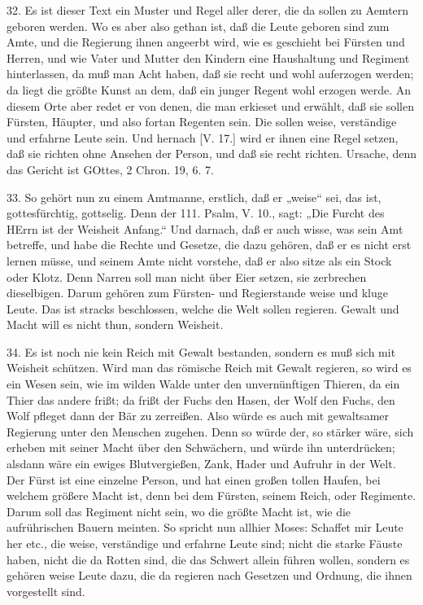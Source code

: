 32. Es ist dieser Text ein Muster und Regel aller derer, die da sollen zu Aemtern geboren werden. Wo es aber also gethan ist, daß die Leute geboren sind zum Amte, und die Regierung ihnen angeerbt wird, wie es geschieht bei Fürsten und Herren, und wie Vater und Mutter den Kindern eine Haushaltung und Regiment hinterlassen, da muß man Acht haben, daß sie recht und wohl auferzogen werden; da liegt die größte Kunst an dem, daß ein junger Regent wohl erzogen werde. An diesem Orte aber redet er von denen, die man erkieset und erwählt, daß sie sollen Fürsten, Häupter, und also fortan Regenten sein. Die sollen weise, verständige und erfahrne Leute sein. Und hernach [V. 17.] wird er ihnen eine Regel setzen, daß sie richten ohne Ansehen der Person, und daß sie recht richten. Ursache, denn das Gericht ist GOttes, 2 Chron. 19, 6. 7.

33. So gehört nun zu einem Amtmanne, erstlich, daß er „weise“ sei, das ist, gottesfürchtig, gottselig. Denn der 111. Psalm, V. 10., sagt: „Die Furcht des HErrn ist der Weisheit Anfang.“ Und darnach, daß er auch wisse, was sein Amt betreffe, und habe die Rechte und Gesetze, die dazu gehören, daß er es nicht erst lernen müsse, und seinem Amte nicht vorstehe, daß er also sitze als ein Stock oder Klotz. Denn Narren soll man nicht über Eier setzen, sie zerbrechen dieselbigen. Darum gehören zum Fürsten- und Regierstande weise und kluge Leute. Das ist stracks beschlossen, welche die Welt sollen regieren. Gewalt und Macht will es nicht thun, sondern Weisheit.

34. Es ist noch nie kein Reich mit Gewalt bestanden, sondern es muß sich mit Weisheit schützen. Wird man das römische Reich mit Gewalt regieren, so wird es ein Wesen sein, wie im wilden Walde unter den unvernünftigen Thieren, da ein Thier das andere frißt; da frißt der Fuchs den Hasen, der Wolf den Fuchs, den Wolf pfleget dann der Bär zu zerreißen. Also würde es auch mit gewaltsamer Regierung unter den Menschen zugehen. Denn so würde der, so stärker wäre, sich erheben mit seiner Macht über den Schwächern, und würde ihn unterdrücken; alsdann wäre ein ewiges Blutvergießen, Zank, Hader und Aufruhr in der Welt. Der Fürst ist eine einzelne Person, und hat einen großen tollen Haufen, bei welchem größere Macht ist, denn bei dem Fürsten, seinem Reich, oder Regimente. Darum soll das Regiment nicht sein, wo die größte Macht ist, wie die aufrührischen Bauern meinten. So spricht nun allhier Moses: Schaffet mir Leute her etc., die weise, verständige und erfahrne Leute sind; nicht die starke Fäuste haben, nicht die da Rotten sind, die das Schwert allein führen wollen, sondern es gehören weise Leute dazu, die da regieren nach Gesetzen und Ordnung, die ihnen vorgestellt sind.

